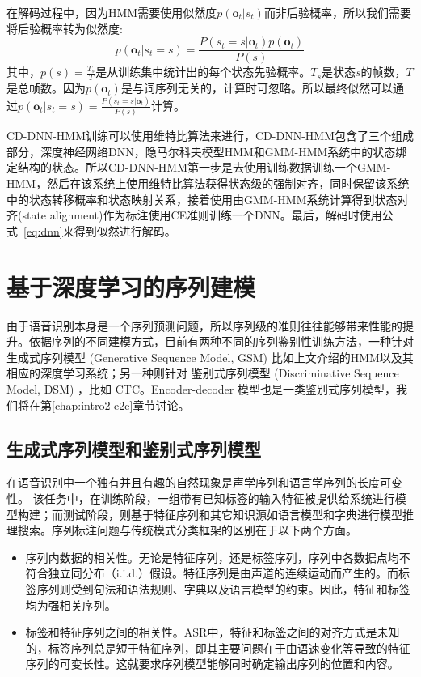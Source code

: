 在解码过程中，因为HMM需要使用似然度$p(\mathbf{o}_t|s_t)$而非后验概率，所以我们需要将后验概率转为似然度:
\begin{equation}
    \label{eq:dnn}
    p(\mathbf{o}_t|s_t=s) = \frac{P(s_t=s|\mathbf{o}_t)p(\mathbf{o}_t)}{P(s)}
\end{equation}
其中，$p(s)=\frac{T_s}{T}$是从训练集中统计出的每个状态先验概率。$T_s$是状态$s$的帧数，$T$是总帧数。因为$p(\mathbf{o}_t)$是与词序列无关的，计算时可忽略。所以最终似然可以通过$p(\mathbf{o}_t|s_t=s)=\frac{P(s_t=s|\mathbf{o}_t)}{P(s)}$计算。

CD-DNN-HMM训练可以使用维特比算法来进行，CD-DNN-HMM包含了三个组成部分，深度神经网络DNN，隐马尔科夫模型HMM和GMM-HMM系统中的状态绑定结构的状态。所以CD-DNN-HMM第一步是去使用训练数据训练一个GMM-HMM，然后在该系统上使用维特比算法获得状态级的强制对齐，同时保留该系统中的状态转移概率和状态映射关系，接着使用由GMM-HMM系统计算得到状态对齐(state alignment)作为标注使用CE准则训练一个DNN。最后，解码时使用公式~\ref{eq:dnn}来得到似然进行解码。



\section{基于深度学习的序列建模}
\label{Sec:seq-tr-review}

由于语音识别本身是一个序列预测问题，所以序列级的准则往往能够带来性能的提升。依据序列的不同建模方式，目前有两种不同的序列鉴别性训练方法，一种针对  生成式序列模型 (Generative Sequence Model, GSM) 比如上文介绍的HMM以及其相应的深度学习系统；另一种则针对 鉴别式序列模型 (Discriminative Sequence Model, DSM) ，比如 CTC。Encoder-decoder 模型也是一类鉴别式序列模型，我们将在第\ref{chap:intro2-e2e}章节讨论。 



\subsection{生成式序列模型和鉴别式序列模型}
\label{Sec:sgm-and-sdm}
在语音识别中一个独有并且有趣的自然现象是声学序列和语言学序列的长度可变性。
该任务中，在训练阶段，一组带有已知标签的输入特征被提供给系统进行模型构建；而测试阶段，则基于特征序列和其它知识源如语言模型和字典进行模型推理搜索。序列标注问题与传统模式分类框架的区别在于以下两个方面。
\begin{itemize}
\item 序列内数据的相关性。无论是特征序列，还是标签序列，序列中各数据点均不符合独立同分布（i.i.d.）假设。特征序列是由声道的连续运动而产生的。而标签序列则受到句法和语法规则、字典以及语言模型的约束。因此，特征和标签均为强相关序列。

\item 标签和特征序列之间的相关性。ASR中，特征和标签之间的对齐方式是未知的，标签序列总是短于特征序列，即其主要问题在于由语速变化等导致的特征序列的可变长性。这就要求序列模型能够同时确定输出序列的位置和内容。
\end{itemize}


